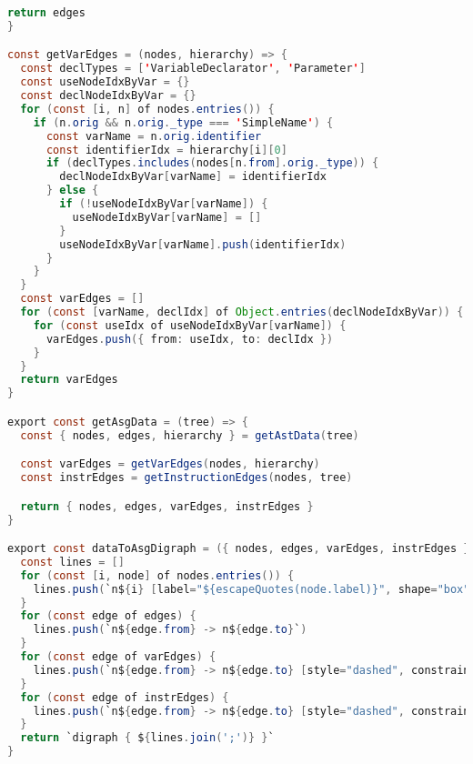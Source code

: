\begin{lstlisting}[language=Java,
caption={asg.js}]
  return edges
}

const getVarEdges = (nodes, hierarchy) => {
  const declTypes = ['VariableDeclarator', 'Parameter']
  const useNodeIdxByVar = {}
  const declNodeIdxByVar = {}
  for (const [i, n] of nodes.entries()) {
    if (n.orig && n.orig._type === 'SimpleName') {
      const varName = n.orig.identifier
      const identifierIdx = hierarchy[i][0]
      if (declTypes.includes(nodes[n.from].orig._type)) {
        declNodeIdxByVar[varName] = identifierIdx
      } else {
        if (!useNodeIdxByVar[varName]) {
          useNodeIdxByVar[varName] = []
        }
        useNodeIdxByVar[varName].push(identifierIdx)
      }
    }
  }
  const varEdges = []
  for (const [varName, declIdx] of Object.entries(declNodeIdxByVar)) {
    for (const useIdx of useNodeIdxByVar[varName]) {
      varEdges.push({ from: useIdx, to: declIdx })
    }
  }
  return varEdges
}

export const getAsgData = (tree) => {
  const { nodes, edges, hierarchy } = getAstData(tree)

  const varEdges = getVarEdges(nodes, hierarchy)
  const instrEdges = getInstructionEdges(nodes, tree)

  return { nodes, edges, varEdges, instrEdges }
}

export const dataToAsgDigraph = ({ nodes, edges, varEdges, instrEdges }) => {
  const lines = []
  for (const [i, node] of nodes.entries()) {
    lines.push(`n${i} [label="${escapeQuotes(node.label)}", shape="box"]`)
  }
  for (const edge of edges) {
    lines.push(`n${edge.from} -> n${edge.to}`)
  }
  for (const edge of varEdges) {
    lines.push(`n${edge.from} -> n${edge.to} [style="dashed", constraint=false, color="blue"]`)
  }
  for (const edge of instrEdges) {
    lines.push(`n${edge.from} -> n${edge.to} [style="dashed", constraint=false, color="red"]`)
  }
  return `digraph { ${lines.join(';')} }`
}
\end{lstlisting}
